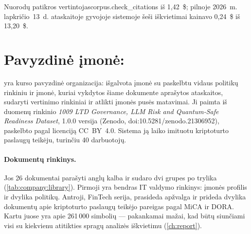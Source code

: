 \begin{pathcard}{Nuorodų patikros vertintojas}{corpus.check_citations}
{    iš 1,42~\$; pilnoje 2026~m. lapkričio~13~d. ataskaitoje gyvojoje sistemoje šeši
    iškvietimai kainavo 0,24~\$ iš 13,20~\$.}
\end{pathcard}


\section{Pavyzdinė įmonė: \demo}\label{sec:company:demo}

\demo{} yra kurso pavyzdinė organizacija: išgalvota įmonė su paskelbtu vidaus politikų
rinkiniu ir įmonė, kuriai vykdytos šiame dokumente aprašytos ataskaitos, sudaryti vertinimo
rinkiniai ir atlikti įmonės pusės matavimai. Ji paimta iš duomenų rinkinio \emph{1009 LTD Governance, LLM Risk and
Quantum-Safe Readiness Dataset}, 1.0.0 versija (Zenodo, doi:10.5281/zenodo.21306952),
paskelbto pagal licenciją CC~BY~4.0. Sistema ją laiko imituotu kriptoturto paslaugų teikėju,
turinčiu 40 darbuotojų.

\paragraph{Dokumentų rinkinys.} Jos 26 dokumentai parašyti anglų kalba ir sudaro dvi grupes po
trylika (\cref{tab:company:library}). Pirmoji yra bendras IT valdymo rinkinys: įmonės profilis
ir dvylika politikų. Antroji, FinTech serija, prasideda apžvalga ir prideda dvylika dokumentų
apie kriptoturto paslaugų teikėjo pareigas pagal MiCA ir DORA. Kartu juose yra apie
261\,000 simbolių --- pakankamai mažai, kad būtų siunčiami visi su kiekvienu atitikties spragų
analizės iškvietimu (\cref{ch:report}).

